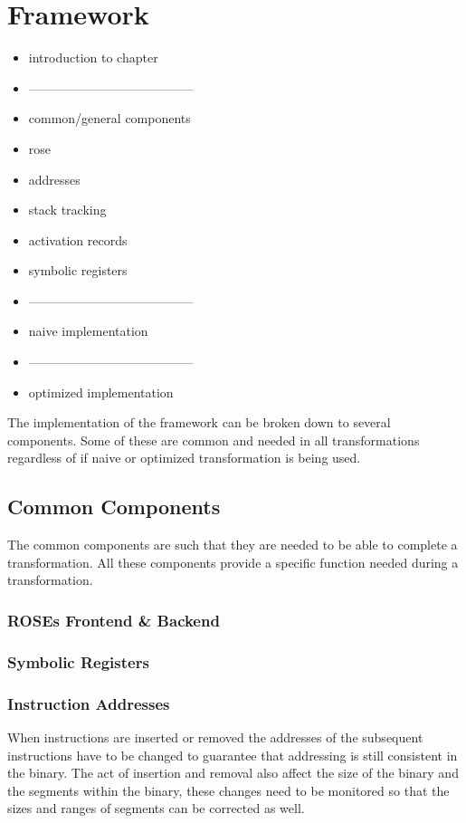 \chapter{Framework}

\begin{itemize}
    \item introduction to chapter
    \item ---------------------------------------
    \item common/general components
    \item rose
    \item addresses
    \item stack tracking
    \item activation records
    \item symbolic registers
    \item ---------------------------------------
    \item naive implementation
    \item ---------------------------------------
    \item optimized implementation
\end{itemize}


The implementation of the framework can be broken down to several components.
Some of these are common and needed in all transformations regardless
of if naive or optimized transformation is being used.

\section{Common Components}
The common components are such that they are needed to be able
to complete a transformation. All these components provide a
specific function needed during a transformation.

\subsection{ROSEs Frontend \& Backend}

\subsection{Symbolic Registers}



\subsection{Instruction Addresses}
When instructions are inserted or removed the addresses of the
subsequent instructions have to be changed to guarantee that
addressing is still consistent in the binary. The act of insertion
and removal also affect the size of the binary and the segments
within the binary, these changes need to be monitored so that
the sizes and ranges of segments can be corrected as well.


